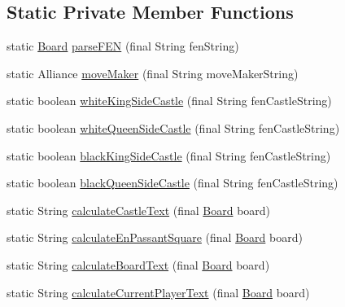 \subsection*{Static Private Member Functions}
\begin{DoxyCompactItemize}
\item 
static \mbox{\hyperlink{classcom_1_1chess_1_1engine_1_1classic_1_1board_1_1_board}{Board}} \mbox{\hyperlink{classcom_1_1chess_1_1pgn_1_1_fen_utilities_a1a43610bf076ec333ae7ceaf760a4f79}{parse\+F\+EN}} (final String fen\+String)
\item 
static Alliance \mbox{\hyperlink{classcom_1_1chess_1_1pgn_1_1_fen_utilities_abeaac0be72403204f3b07f0d04ee04b6}{move\+Maker}} (final String move\+Maker\+String)
\item 
static boolean \mbox{\hyperlink{classcom_1_1chess_1_1pgn_1_1_fen_utilities_aba302a0f866ba7ed6e072979c4c4c724}{white\+King\+Side\+Castle}} (final String fen\+Castle\+String)
\item 
static boolean \mbox{\hyperlink{classcom_1_1chess_1_1pgn_1_1_fen_utilities_ac20a5272906e6654c5a448f727ebf899}{white\+Queen\+Side\+Castle}} (final String fen\+Castle\+String)
\item 
static boolean \mbox{\hyperlink{classcom_1_1chess_1_1pgn_1_1_fen_utilities_a11d884f9656261f8438b15d8b328137f}{black\+King\+Side\+Castle}} (final String fen\+Castle\+String)
\item 
static boolean \mbox{\hyperlink{classcom_1_1chess_1_1pgn_1_1_fen_utilities_a050faa1ae75188bb607087834c0bcc4b}{black\+Queen\+Side\+Castle}} (final String fen\+Castle\+String)
\item 
static String \mbox{\hyperlink{classcom_1_1chess_1_1pgn_1_1_fen_utilities_aeb0384af3b05319ac44d90b9e3b52866}{calculate\+Castle\+Text}} (final \mbox{\hyperlink{classcom_1_1chess_1_1engine_1_1classic_1_1board_1_1_board}{Board}} board)
\item 
static String \mbox{\hyperlink{classcom_1_1chess_1_1pgn_1_1_fen_utilities_a856ef343035ee3d04745303077484723}{calculate\+En\+Passant\+Square}} (final \mbox{\hyperlink{classcom_1_1chess_1_1engine_1_1classic_1_1board_1_1_board}{Board}} board)
\item 
static String \mbox{\hyperlink{classcom_1_1chess_1_1pgn_1_1_fen_utilities_aad23dbd3b7cbfd8f9d168de61f7ac278}{calculate\+Board\+Text}} (final \mbox{\hyperlink{classcom_1_1chess_1_1engine_1_1classic_1_1board_1_1_board}{Board}} board)
\item 
static String \mbox{\hyperlink{classcom_1_1chess_1_1pgn_1_1_fen_utilities_a1ed8fafa82f6feb8f22da59609a832f0}{calculate\+Current\+Player\+Text}} (final \mbox{\hyperlink{classcom_1_1chess_1_1engine_1_1classic_1_1board_1_1_board}{Board}} board)
\end{DoxyCompactItemize}


